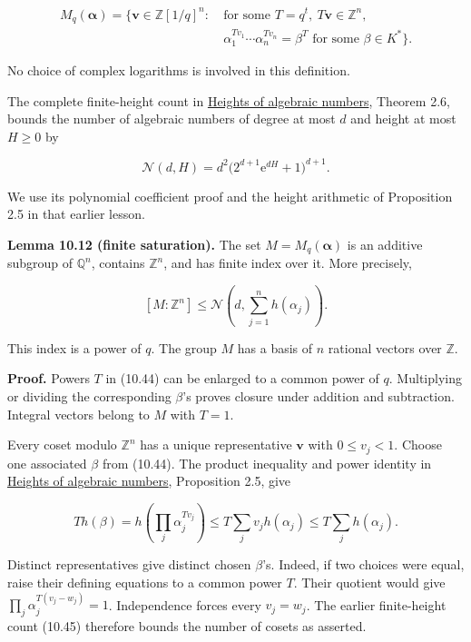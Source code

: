 \documentclass[
  11pt,
  a4paper,
]{article}
\begin{document}
\[
\begin{aligned}
M_q(\boldsymbol\alpha)=\{\boldsymbol v\in\mathbb Z[1/q]^n:\ &\text{for some }T=q^t,
\ T\boldsymbol v\in\mathbb Z^n,\\
&\alpha_1^{Tv_1}\cdots\alpha_n^{Tv_n}=\beta^T
\text{ for some }\beta\in K^*\}.
\end{aligned}
\tag{10.44}
\]

No choice of complex logarithms is involved in this definition.

The complete finite-height count in
\href{../../TR-TRANS/TR-TRANS-02.html\#theorem-2-6-northcott-s-finite-box}{Heights
of algebraic numbers}, Theorem 2.6, bounds the number of algebraic
numbers of degree at most \(d\) and height at most \(H\ge0\) by

\[
\mathcal N(d,H)=d^2\bigl(2^{d+1}\mathrm e^{dH}+1\bigr)^{d+1}.
\tag{10.45}
\]

We use its polynomial coefficient proof and the height arithmetic of
Proposition 2.5 in that earlier lesson.

\textbf{Lemma 10.12 (finite saturation).} The set
\(M=M_q(\boldsymbol\alpha)\) is an additive subgroup of \(\mathbb Q^n\),
contains \(\mathbb Z^n\), and has finite index over it. More precisely,

\[
 [M:\mathbb Z^n]\le\mathcal N\left(d,\sum_{j=1}^n h(\alpha_j)\right).
\tag{10.46}
\]

This index is a power of \(q\). The group \(M\) has a basis of \(n\)
rational vectors over \(\mathbb Z\).

\textbf{Proof.} Powers \(T\) in (10.44) can be enlarged to a common
power of \(q\). Multiplying or dividing the corresponding \(\beta\)'s
proves closure under addition and subtraction. Integral vectors belong
to \(M\) with \(T=1\).

Every coset modulo \(\mathbb Z^n\) has a unique representative
\(\boldsymbol v\) with \(0\le v_j<1\). Choose one associated \(\beta\)
from (10.44). The product inequality and power identity in
\href{../../TR-TRANS/TR-TRANS-02.html\#proposition-2-5-sums-products-powers-and-conjugates}{Heights
of algebraic numbers}, Proposition 2.5, give

\[
 T h(\beta)=h\left(\prod_j\alpha_j^{Tv_j}\right)
 \le T\sum_j v_jh(\alpha_j)\le T\sum_j h(\alpha_j).
\]

Distinct representatives give distinct chosen \(\beta\)'s. Indeed, if
two choices were equal, raise their defining equations to a common power
\(T\). Their quotient would give \(\prod_j\alpha_j^{T(v_j-w_j)}=1\).
Independence forces every \(v_j=w_j\). The earlier finite-height count
(10.45) therefore bounds the number of cosets as asserted.
\end{document}

